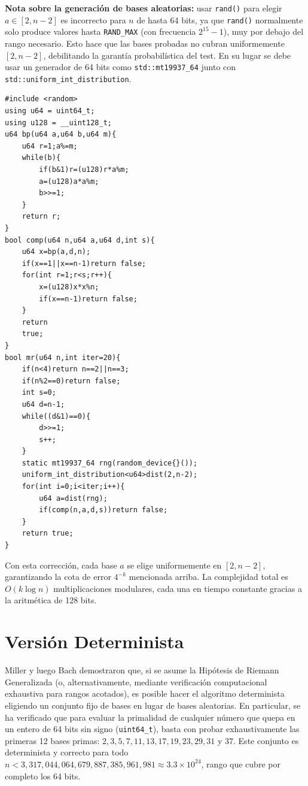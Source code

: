 \documentclass[11pt,a4paper]{article}
\begin{document}
\textbf{Nota sobre la generación de bases aleatorias:} usar \texttt{rand()} para elegir $a \in [2, n-2]$ es incorrecto para $n$ de hasta 64 bits, ya que \texttt{rand()} normalmente solo produce valores hasta \texttt{RAND\_MAX} (con frecuencia $2^{15}-1$), muy por debajo del rango necesario. Esto hace que las bases probadas no cubran uniformemente $[2, n-2]$, debilitando la garantía probabilística del test. En su lugar se debe usar un generador de 64 bits como \texttt{std::mt19937\_64} junto con \texttt{std::uniform\_int\_distribution}.

\begin{lstlisting}
#include <random>
using u64 = uint64_t;
using u128 = __uint128_t;
u64 bp(u64 a,u64 b,u64 m){
    u64 r=1;a%=m;
    while(b){
        if(b&1)r=(u128)r*a%m;
        a=(u128)a*a%m;
        b>>=1;
    }
    return r;
}
bool comp(u64 n,u64 a,u64 d,int s){
    u64 x=bp(a,d,n);
    if(x==1||x==n-1)return false;
    for(int r=1;r<s;r++){
        x=(u128)x*x%n;
        if(x==n-1)return false;
    }
    return 
    true;
}
bool mr(u64 n,int iter=20){
    if(n<4)return n==2||n==3;
    if(n%2==0)return false;
    int s=0;
    u64 d=n-1;
    while((d&1)==0){
        d>>=1;
        s++;
    }
    static mt19937_64 rng(random_device{}());
    uniform_int_distribution<u64>dist(2,n-2);
    for(int i=0;i<iter;i++){
        u64 a=dist(rng);
        if(comp(n,a,d,s))return false;
    }
    return true;
}
\end{lstlisting}
Con esta corrección, cada base $a$ se elige uniformemente en $[2, n-2]$, garantizando la cota de error $4^{-k}$ mencionada arriba. La complejidad total es $O(k \log n)$ multiplicaciones modulares, cada una en tiempo constante gracias a la aritmética de 128 bits.

\section*{Versión Determinista}
Miller y luego Bach demostraron que, si se asume la Hipótesis de Riemann Generalizada (o, alternativamente, mediante verificación computacional exhaustiva para rangos acotados), es posible hacer el algoritmo determinista eligiendo un conjunto fijo de bases en lugar de bases aleatorias. En particular, se ha verificado que para evaluar la primalidad de cualquier número que quepa en un entero de 64 bits sin signo (\texttt{uint64\_t}), basta con probar exhaustivamente las primeras 12 bases primas: $2, 3, 5, 7, 11, 13, 17, 19, 23, 29, 31$ y $37$. Este conjunto es determinista y correcto para todo $n < 3{,}317{,}044{,}064{,}679{,}887{,}385{,}961{,}981 \approx 3.3 \times 10^{24}$, rango que cubre por completo los 64 bits.
\end{document}
